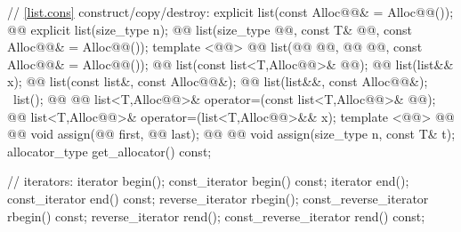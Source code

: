 \documentclass[american,twoside]{book}
\begin{document}
\begin{codeblock}
{{    // \ref{list.cons} construct/copy/destroy:
    explicit list(const Alloc@@& = Alloc@@());
    @@ explicit list(size_type n);
    @@ 
      list(size_type @@, const T& @@, const Alloc@@& = Alloc@@());
    template <@@>
      @@
      list(@@ @@, @@ @@, const Alloc@@& = Alloc@@());
    @@ list(const list<T,Alloc@@>& @@);
    @@ list(list&& x);
    @@ list(const list&, const Alloc@@&);
    @@ list(list&&, const Alloc@@&);
   ~list();
    @@ @@
      list<T,Alloc@@>& operator=(const list<T,Alloc@@>& @@);
    @@
      list<T,Alloc@@>& operator=(list<T,Alloc@@>&& x);
    template <@@>
      @@
            @@
      void assign(@@ first, @@ last);
    @@ @@
      void assign(size_type n, const T& t);
    allocator_type get_allocator() const;

    // iterators:
    iterator               begin();
    const_iterator         begin() const;
    iterator               end();
    const_iterator         end() const;
    reverse_iterator       rbegin();
    const_reverse_iterator rbegin() const;
    reverse_iterator       rend();
    const_reverse_iterator rend() const;

}}
\end{codeblock}
\end{document}
